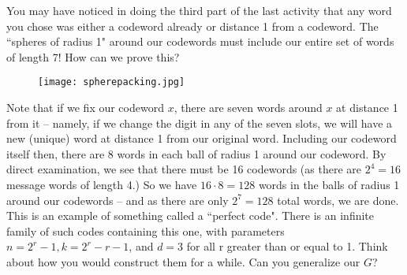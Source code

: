  \vspace{0.2cm}

You may have noticed in doing the third part of the last activity that any word you chose was either a codeword already or distance 1 from a codeword. The ``spheres of radius 1" around our codewords must include our entire set of words of length 7! How can we prove this? \\

\begin{figure}[H]
   \centering
   \texttt{[image: spherepacking.jpg]} 
\end{figure}

Note that if we fix our codeword $x$, there are seven words around $x$ at distance 1 from it -- namely, if we change the digit in any of the seven slots, we will have a new (unique) word at distance 1 from our original word. Including our codeword itself then, there are 8 words in each ball of radius 1 around our codeword. By direct examination, we see that there must be 16 codewords (as there are $2^4=16$ message words of length 4.) So we have $16\cdot 8=128$ words in the balls of radius 1 around our codewords -- and as there are only $2^7=128$ total words, we are done. \\

This is an example of something called a ``perfect code". There is an infinite family of such codes containing this one, with parameters $n=2^{r}-1, k=2^r-r-1$, and $d=3$ for all r greater than or equal to 1. Think about how you would construct them for a while. Can you generalize our $G$? \\

